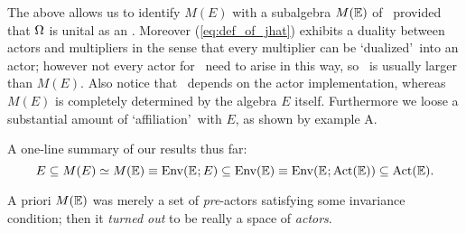 \begin{remarks_sec} \rm
\item
The above allows us to identify $M(E)$ with a subalgebra $M(\mathbb{E})$ of \EnvE\
provided that $\Omega$ is unital as an \Ebimod\@. Moreover (\ref{eq:def_of_jhat})
exhibits a duality between actors and multipliers in the sense that every
multiplier can be \lq dualized\rq\ into an actor;
however not every actor for \EE\ need to arise in this way,
so \EnvE\ is usually larger than $M(E)$\@.
Also notice that \EnvE\ depends on the actor implementation,
whereas $M(E)$ is completely determined by the algebra $E$ itself.
Furthermore we loose a substantial amount of \lq affiliation\rq\ with $E$,
as shown by example A.
\item
A one-line summary of our results thus far:
$$ E \subseteq M(E) \simeq M(\mathbb{E}) \equiv {\rm Env}(\mathbb{E}\hspace{.5pt};E)
   \subseteq \mbox{\rm Env}(\mathbb{E}) \equiv {\rm Env}(\mathbb{E}\hspace{.5pt};\mbox{\rm Act}(\mathbb{E}))
   \subseteq \mbox{\rm Act}(\mathbb{E}). $$
\item
A priori $M(\mathbb{E})$ was merely a set of {\em pre\/}-actors satisfying some invariance
condition; then it {\em turned out\/} to be really a space of {\em actors}.
\end{remarks_sec}
